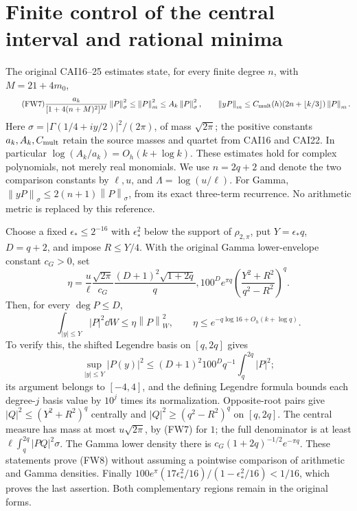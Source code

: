 \documentclass[11pt]{article}
\newcommand{\norm}[1]{\left\lVert#1\right\rVert}
\begin{document}
\section{Finite control of the central interval and rational minima}
The original CAI16--25 estimates \cite{cai} state, for every finite degree
$n$, with $M=21+4m_0$,
\begin{equation}\tag{FW7}
 \frac{a_k}{[1+4(n+M)^2]^M}\norm P_\sigma^2
 \le\norm P_m^2\le A_k\norm P_\sigma^2,
 \qquad \norm{yP}_m\le C_{\rm mult}(h)(2n+\lfloor k/3\rfloor)\norm P_m.
\end{equation}
Here $\sigma=|\Gamma(1/4+iy/2)|^2/(2\pi)$, of mass $\sqrt{2\pi}$;
the positive constants $a_k,A_k,C_{\rm mult}$ retain the source masses
and quartet from CAI16 and CAI22. In particular
$\log(A_k/a_k)=O_h(k+\log k)$. These estimates hold for complex
polynomials, not merely real monomials. We use $n=2q+2$ and denote the
two comparison constants by $\ell,u$, and $\Lambda=\log(u/\ell)$.
For Gamma, $\norm{yP}_\sigma\le2(n+1)\norm P_\sigma$, from its exact
three-term recurrence. No arithmetic metric is replaced by this reference.

Choose a fixed $\epsilon_*\le2^{-16}$ with $\epsilon_*^2$ below the
support of $\rho_{2,\pi}$, put $Y=\epsilon_*q$, $D=q+2$, and impose
$R\le Y/4$. With the original Gamma lower-envelope constant $c_G>0$,
set
\begin{equation}\tag{FW8}
 \eta=\frac{u}{\ell}\frac{\sqrt{2\pi}}{c_G}
 \frac{(D+1)^2\sqrt{1+2q}}q,100^D e^{\pi q}
 \left(\frac{Y^2+R^2}{q^2-R^2}\right)^q.
\end{equation}
Then, for every $\deg P\le D$,
\begin{equation}\tag{FW9}
 \int_{|y|\le Y}|P|^2\dd W\le\eta\norm P_W^2,
 \qquad \eta\le e^{-q\log16+O_h(k+\log q)}.
\end{equation}
To verify this, the shifted Legendre basis on $[q,2q]$ gives
\[
 \sup_{|y|\le Y}|P(y)|^2\le (D+1)^2 100^Dq^{-1}\int_q^{2q}|P|^2;
\]
its argument belongs to $[-4,4]$, and the defining Legendre formula
bounds each degree-$j$ basis value by $10^j$ times its normalization.
Opposite-root pairs give $|Q|^2\le(Y^2+R^2)^q$ centrally and
$|Q|^2\ge(q^2-R^2)^q$ on $[q,2q]$. The central measure has mass at
most $u\sqrt{2\pi}$, by (FW7) for $1$; the full denominator is at
least $\ell\int_q^{2q}|PQ|^2\sigma$. The Gamma lower density there
is $c_G(1+2q)^{-1/2}e^{-\pi q}$. These statements prove (FW8) without
assuming a pointwise comparison of arithmetic and Gamma densities.
Finally $100e^\pi(17\epsilon_*^2/16)/(1-\epsilon_*^2/16)<1/16$,
which proves the last assertion. Both complementary regions remain in
the original forms.
\end{document}
